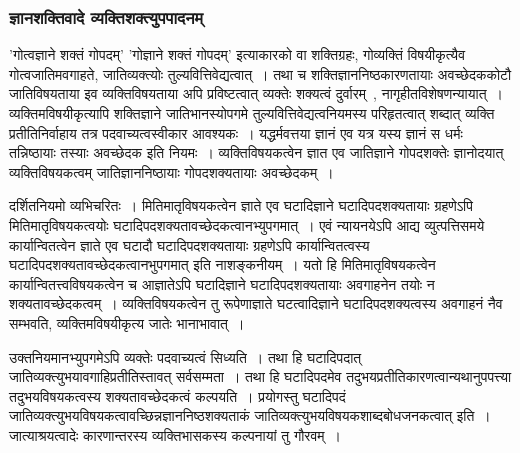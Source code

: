 			\subsubsection{ज्ञानशक्तिवादे व्यक्तिशक्त्युपपादनम्}
				
				'गोत्वज्ञाने शक्तं गोपदम्' 'गोज्ञाने शक्तं गोपदम्' इत्याकारको वा शक्तिग्रहः, गोव्यक्तिं विषयीकृत्यैव गोत्वजातिमवगाहते, जातिव्यक्त्योः तुल्यवित्तिवेद्यत्वात्~। तथा च शक्तिज्ञाननिष्ठकारणतायाः अवच्छेदककोटौ जातिविषयताया इव व्यक्तिविषयताया अपि प्रविष्टत्वात् व्यक्तेः शक्यत्वं दुर्वारम्~, नागृहीतविशेषणन्यायात्~। व्यक्तिमविषयीकृत्यापि शक्तिज्ञाने जातिभानस्योपगमे तुल्यवित्तिवेद्यत्वनियमस्य परिहृतत्वात् शब्दात् व्यक्ति प्रतीतिनिर्वाहाय तत्र पदवाच्यत्वस्वीकार आवश्यकः~। यद्धर्मवत्तया ज्ञानं एव यत्र यस्य ज्ञानं स धर्मः तन्निष्ठायाः तस्याः अवच्छेदक इति नियमः~। व्यक्तिविषयकत्वेन ज्ञात एव जातिज्ञाने गोपदशक्तेः ज्ञानोदयात् व्यक्तिविषयकत्वम् जातिज्ञाननिष्ठायाः गोपदशक्यतायाः अवच्छेदकम्~। 

				दर्शितनियमो व्यभिचरितः~। मितिमातृविषयकत्वेन ज्ञाते एव घटादिज्ञाने घटादिपदशक्यतायाः ग्रहणेऽपि मितिमातृविषयकत्वयोः घटादिपदशक्यतावच्छेदकत्वानभ्युपगमात्~। एवं न्यायनयेऽपि आद्य व्युत्पत्तिसमये कार्यान्वितत्वेन ज्ञाते एव घटादौ घटादिपदशक्यतायाः ग्रहणेऽपि कार्यान्वितत्वस्य घटादिपदशक्यतावच्छेदकत्वानभुपगमात् इति नाशङ्कनीयम्~। यतो हि मितिमातृविषयकत्वेन कार्यान्वितत्त्वविषयकत्वेन च आज्ञातेऽपि घटादिज्ञाने घटादिपदशक्यतायाः अवगाहनेन तयोः न शक्यतावच्छेदकत्वम्~।  व्यक्तिविषयकत्वेन तु रूपेणाज्ञाते घटत्वादिज्ञाने घटादिपदशक्यत्वस्य अवगाहनं नैव सम्भवति, व्यक्तिमविषयीकृत्य जातेः भानाभावात्~। 

				उक्तनियमानभ्युपगमेऽपि व्यक्तेः पदवाच्यत्वं सिध्यति~। तथा हि घटादिपदात् जातिव्यक्त्युभयावगाहिप्रतीतिस्तावत् सर्वसम्मता~। तथा हि घटादिपदमेव तदुभयप्रतीतिकारणत्वान्यथानुपपत्त्या तदुभयविषयकत्वस्य शक्यतावच्छेदकत्वं कल्पयति~। प्रयोगस्तु घटादिपदं जातिव्यक्त्युभयविषयकत्वावच्छिन्नज्ञाननिष्ठशक्यताकं जातिव्यक्त्युभयविषयकशाब्दबोधजनकत्वात् इति~। जात्याश्रयत्वादेः कारणान्तरस्य व्यक्तिभासकस्य कल्पनायां तु गौरवम्~। 

